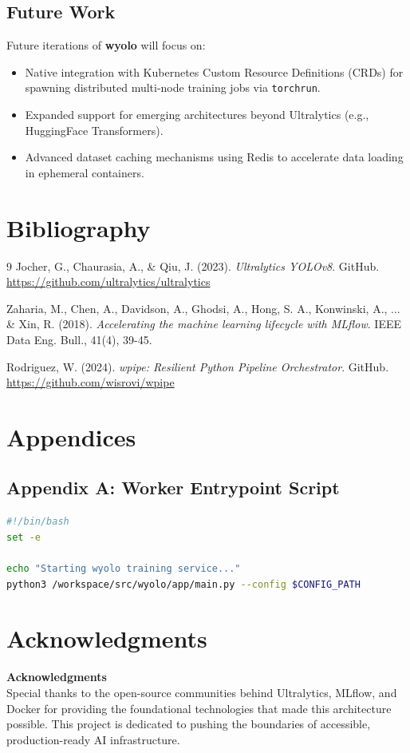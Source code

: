 \documentclass[12pt,a4paper]{report}
\begin{document}
\section{Future Work}
Future iterations of \textbf{wyolo} will focus on:
\begin{itemize}
    \item Native integration with Kubernetes Custom Resource Definitions (CRDs) for spawning distributed multi-node training jobs via \texttt{torchrun}.
    \item Expanded support for emerging architectures beyond Ultralytics (e.g., HuggingFace Transformers).
    \item Advanced dataset caching mechanisms using Redis to accelerate data loading in ephemeral containers.
\end{itemize}

\chapter{Bibliography}
\cleardoublepage
\begin{thebibliography}{9}
Jocher, G., Chaurasia, A., \& Qiu, J. (2023). \textit{Ultralytics YOLOv8}. GitHub. \url{https://github.com/ultralytics/ultralytics}

Zaharia, M., Chen, A., Davidson, A., Ghodsi, A., Hong, S. A., Konwinski, A., ... \& Xin, R. (2018). \textit{Accelerating the machine learning lifecycle with MLflow}. IEEE Data Eng. Bull., 41(4), 39-45.

Rodriguez, W. (2024). \textit{wpipe: Resilient Python Pipeline Orchestrator}. GitHub. \url{https://github.com/wisrovi/wpipe}
\end{thebibliography}

\chapter{Appendices}
\cleardoublepage
\section{Appendix A: Worker Entrypoint Script}
\begin{lstlisting}[language=bash, caption=train\_service.sh Entrypoint]
#!/bin/bash
set -e

echo "Starting wyolo training service..."
python3 /workspace/src/wyolo/app/main.py --config $CONFIG_PATH
\end{lstlisting}

\chapter*{Acknowledgments}
\cleardoublepage
\thispagestyle{empty}
\vspace*{5cm}
\begin{center}
    {\Large \textbf{Acknowledgments}}\\[1cm]
    Special thanks to the open-source communities behind Ultralytics, MLflow, and Docker for providing the foundational technologies that made this architecture possible. This project is dedicated to pushing the boundaries of accessible, production-ready AI infrastructure.
\end{center}
\end{document}
